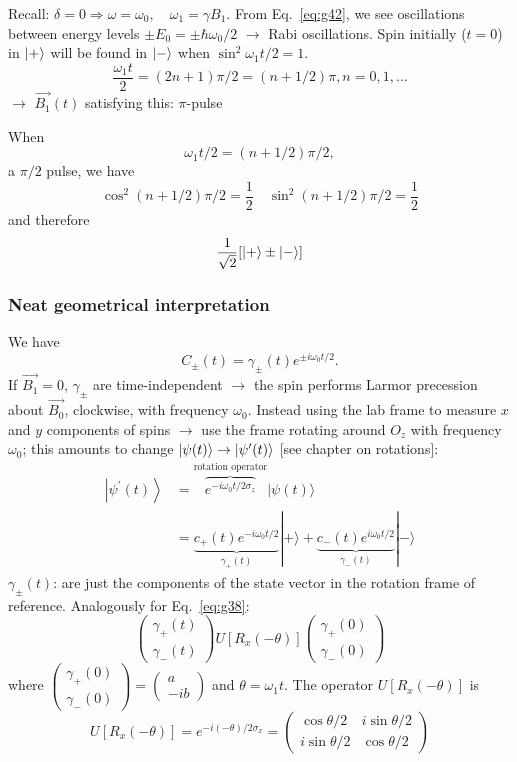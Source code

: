 \documentclass[12pt]{article}
\newcommand{\be}{\begin{equation}}
\newcommand{\ee}{\end{equation}}
\begin{document}

Recall: $\delta = 0 \Rightarrow \omega = \omega_0,\quad \omega_1 = \gamma B_1$.
From Eq.~\eqref{eq:g42}, we see oscillations between energy
levels $\pm E_0 = \pm \hbar\omega_0/2$ $\to$ Rabi oscillations.
Spin initially ($t=0$) in $\ket{+}$ will be
found in $\ket{-}$ when $\sin ^{2} \omega_{1} t / 2=1$.
\[
\frac{\omega_{1} t}{2}=(2 n+1) \pi / 2=(n+1 / 2) \pi, n=0,1, \ldots
\]
$\to$ $\vec{B_1}(t)$ satisfying this: $\pi$-pulse

When 
\be
\omega_{1} t / 2=(n+1 / 2) \pi / 2,
\ee
a $\pi/2$ pulse, we have
\[
\cos ^{2}(n+1 / 2) \pi / 2=\frac{1}{2} \quad 
\sin ^{2}(n+1 / 2) \pi / 2=\frac{1}{2}
\]
and therefore
\be
\frac{1}{\sqrt{2}}
[\ket{+} \pm \ket{-}]
\ee

\subsubsection{Neat geometrical interpretation}

We have
\[
C_{\pm}(t)=\gamma_{\pm}(t) e^{\pm i \omega_{0} t / 2}.
\]
If $\vec{B_1} = 0$, $\gamma_\pm$ are time-independent 
$\to$ the spin performs Larmor precession
about $\vec{B_0}$, clockwise, with frequency $\omega_0$.
Instead using the lab frame to measure $x$ and $y$
components of spins $\to$ use the frame rotating
around $O_z$ with frequency $\omega_0$; this amounts
to change $\ket{\psi(t)} \to \ket{\psi^\prime(t)}$ [see chapter on rotations]:
\[
\begin{aligned}
\left|\psi^{\prime}(t)\right\rangle
&=\overbrace{e^{-i \omega_{0} t / 2 \sigma_{z}}}%
^{\text{rotation operator}}
|\psi(t)\rangle\\
&=\underbrace{c_{+}(t) e^{-i \omega_{0} t / 2}}%
_{\gamma_+(t)}|+\rangle
 +\underbrace{c_{-}(t) e^{i \omega_{0} t / 2}}%
_{\gamma_-(t)}|-\rangle
\end{aligned}
\]
$\gamma_\pm(t)$: are just the components of 
the state vector in the rotation
frame of reference.
Analogously for Eq.~\eqref{eq:g38}:
\[
\begin{pmatrix}
\gamma_+(t)\\
\gamma_-(t)
\end{pmatrix}
U[R_x(-\theta)]
\begin{pmatrix}
\gamma_+(0)\\
\gamma_-(0)
\end{pmatrix}
\]
where $\begin{pmatrix}
\gamma_+(0)\\
\gamma_-(0)
\end{pmatrix} = 
\begin{pmatrix}
a\\
-ib
\end{pmatrix}
$ and $\theta = \omega_1 t$.
The operator $U[R_x(-\theta)]$ is
\[
U[R_x(-\theta)] = e^{-i(-\theta)/2 \sigma_x} = 
\begin{pmatrix}
\cos \theta/2 & i \sin \theta/2\\
i \sin \theta/2 & \cos \theta/2
\end{pmatrix}
\]
\end{document}
